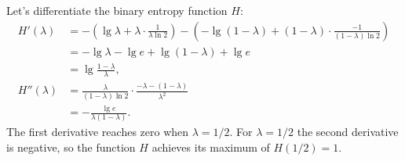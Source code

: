 \starred
Let's differentiate the binary entropy function $H$:
\begin{align*}
    H'(\lambda) &= -\left(\lg\lambda+\lambda\cdot\frac{1}{\lambda\ln2}\right)-\left(-\lg(1-\lambda)+(1-\lambda)\cdot\frac{-1}{(1-\lambda)\ln2}\right) \\[1mm]
    &= -\lg\lambda-\lg e+\lg(1-\lambda)+\lg e \\[1mm]
    &= \lg\frac{1-\lambda}{\lambda}, \\[1mm]
    H''(\lambda) &= \frac{\lambda}{(1-\lambda)\ln2}\cdot\frac{-\lambda-(1-\lambda)}{\lambda^2} \\[1mm]
    &= -\frac{\lg e}{\lambda(1-\lambda)}.
\end{align*}
The first derivative reaches zero when $\lambda=1/2$.
For $\lambda=1/2$ the second derivative is negative, so the function $H$ achieves its maximum of $H(1/2)=1$.
